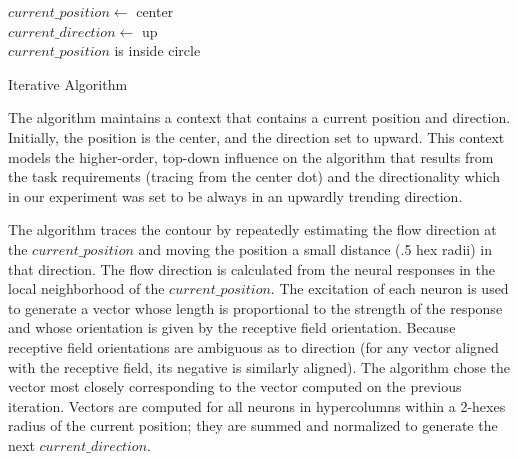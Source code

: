\documentclass[prodmode,acmtap]{acmlarge}
\begin{document}
\medskip
\begin{algorithm}[H]
\SetAlgoNoLine
$current\_position \leftarrow$ center \\
$current\_direction \leftarrow$ up \\
$current\_position$ is inside circle \\
    \caption{Iterative Algorithm}
    \label{alg:one}
  \end{algorithm}
\medskip

The algorithm maintains a context that contains a current position
and direction. Initially, the position is the center, and the
direction set to upward. This context models the higher-order,
top-down influence on the algorithm that results from the task
requirements (tracing from the center dot) and the directionality
which in our experiment was set to be always in an upwardly trending direction.

The algorithm traces the contour by repeatedly estimating the flow
direction at the $current\_position$ and moving the position a small
distance (.5 hex radii) in that direction. The flow direction is
calculated from the neural responses in the local neighborhood of the
$current\_position$. The excitation of each neuron is used to
generate a vector whose length is proportional to the strength of the
response and whose orientation is given by the receptive field
orientation. Because receptive field orientations are ambiguous as to
direction (for any vector aligned with the receptive field, its
negative is similarly aligned). The algorithm chose the vector most
closely corresponding to the vector computed on the previous
iteration. Vectors are computed for all neurons in hypercolumns
within a 2-hexes radius of the current position; they are summed and
normalized to generate the next $current\_direction$.
\end{document}
